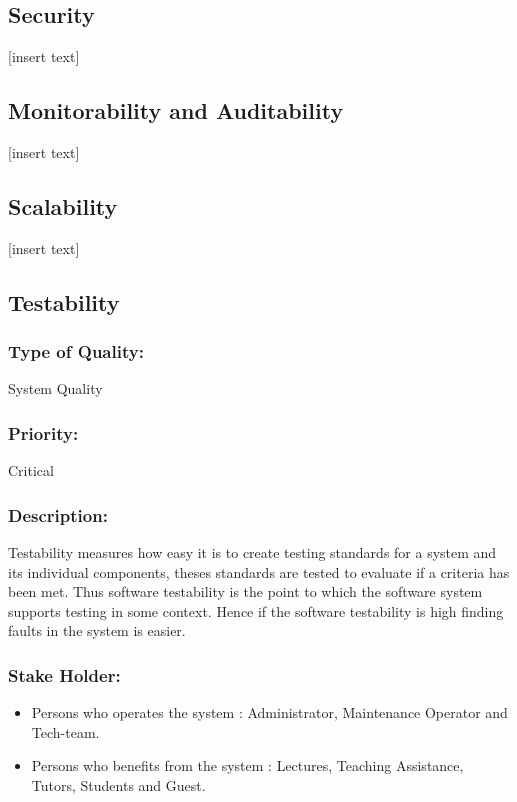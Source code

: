 \documentclass[11pt]{article}
\begin{document}
	\subsection{Security}
		[insert text]
	\subsection{Monitorability and Auditability}
		[insert text]
	
	\subsection{Scalability}	
		[insert text]
	
	\subsection{Testability}
	
		\subsubsection{Type of Quality:}
			\textbf{} System Quality
		
		\subsubsection{Priority:}
			\textbf{} Critical
		
		\subsubsection{Description:}
			\textbf{}Testability measures how easy it is to create testing standards for a system and its individual components, theses standards are tested to evaluate if a criteria has been met. Thus software testability is the point to which the software system supports testing in some context. Hence if the software testability is high finding faults in the system is easier.
		
		\subsubsection{Stake Holder:}
		\begin{itemize}
			\item Persons who operates the system : Administrator, Maintenance Operator and Tech-team.
			\item Persons who benefits from the system : Lectures, Teaching Assistance, Tutors, Students and Guest.
			\end{itemize}
\end{document}
